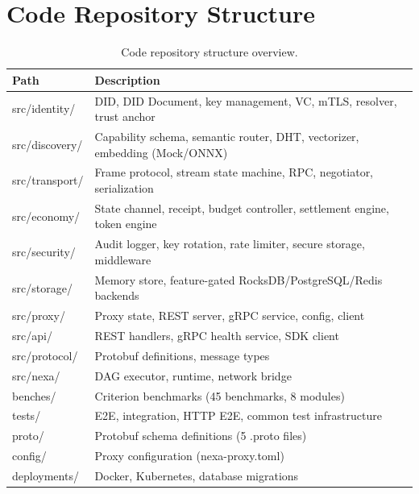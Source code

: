 \section{Code Repository Structure}

\begin{table}[h]
\centering
\small
\begin{tabular}{@{}lp{6cm}@{}}
\toprule
Path & Description \\
\midrule
src/identity/ & DID, DID Document, key management, VC, mTLS, resolver, trust anchor \\
src/discovery/ & Capability schema, semantic router, DHT, vectorizer, embedding (Mock/ONNX) \\
src/transport/ & Frame protocol, stream state machine, RPC, negotiator, serialization \\
src/economy/ & State channel, receipt, budget controller, settlement engine, token engine \\
src/security/ & Audit logger, key rotation, rate limiter, secure storage, middleware \\
src/storage/ & Memory store, feature-gated RocksDB/PostgreSQL/Redis backends \\
src/proxy/ & Proxy state, REST server, gRPC service, config, client \\
src/api/ & REST handlers, gRPC health service, SDK client \\
src/protocol/ & Protobuf definitions, message types \\
src/nexa/ & DAG executor, runtime, network bridge \\
benches/ & Criterion benchmarks (45 benchmarks, 8 modules) \\
tests/ & E2E, integration, HTTP E2E, common test infrastructure \\
proto/ & Protobuf schema definitions (5 .proto files) \\
config/ & Proxy configuration (nexa-proxy.toml) \\
deployments/ & Docker, Kubernetes, database migrations \\
\bottomrule
\end{tabular}
\caption{Code repository structure overview.}
\label{tab:code-structure}
\end{table}